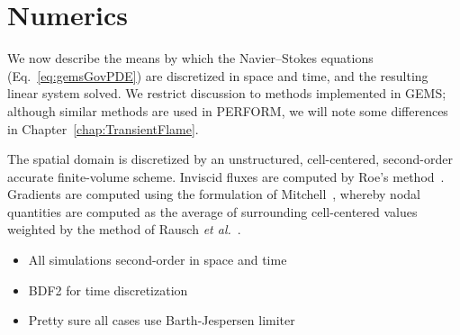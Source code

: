 \section{Numerics}\label{sec:numerics}

We now describe the means by which the Navier--Stokes equations (Eq.~\ref{eq:gemsGovPDE}) are discretized in space and time, and the resulting linear system solved. We restrict discussion to methods implemented in GEMS; although similar methods are used in PERFORM, we will note some differences in Chapter~\ref{chap:TransientFlame}.

The spatial domain is discretized by an unstructured, cell-centered, second-order accurate finite-volume scheme. Inviscid fluxes are computed by Roe's method~\cite{Roe1981}. Gradients are computed using the formulation of Mitchell~\cite{Mitchell1994}, whereby nodal quantities are computed as the average of surrounding cell-centered values weighted by the method of Rausch \textit{et al.}~\cite{Rausch1991}.

\begin{itemize}
	\item All simulations second-order in space and time
	\item BDF2 for time discretization
	\item Pretty sure all cases use Barth-Jespersen limiter
\end{itemize}